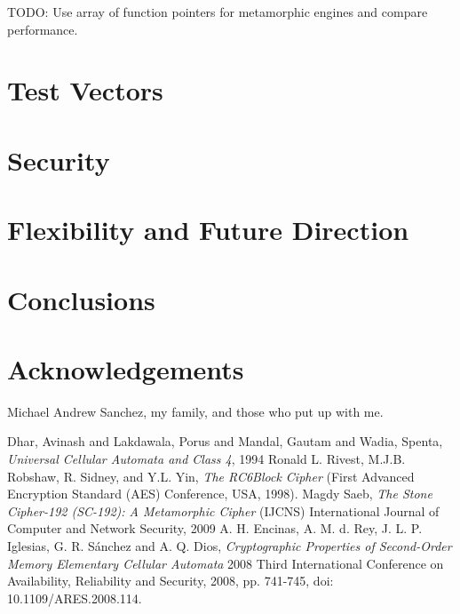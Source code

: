 \documentclass{article}
\begin{document}
TODO: Use array of function pointers for metamorphic engines and compare performance.

\section{Test Vectors}

\section{Security}

\section{Flexibility and Future Direction}

\section{Conclusions}

\section{Acknowledgements}

Michael Andrew Sanchez, my family, and those who put up with me.

\begin{thebibliography}{unsrt}
  Dhar, Avinash and Lakdawala, Porus and Mandal, Gautam and Wadia, Spenta, \emph{Universal Cellular Automata and Class 4}, 1994
  Ronald L. Rivest, M.J.B. Robshaw, R. Sidney, and Y.L. Yin, \emph{The RC6\texttrademark Block Cipher} (First Advanced Encryption Standard (AES) Conference, USA, 1998).
  Magdy Saeb, \emph{The Stone Cipher-192 (SC-192): A Metamorphic Cipher} (IJCNS) International Journal of Computer and Network Security, 2009
  A. H. Encinas, A. M. d. Rey, J. L. P. Iglesias, G. R. Sánchez and A. Q. Dios, \emph{Cryptographic Properties of Second-Order Memory Elementary Cellular Automata} 2008 Third International Conference on Availability, Reliability and Security, 2008, pp. 741-745, doi: 10.1109/ARES.2008.114.
\end{thebibliography}
\end{document}
